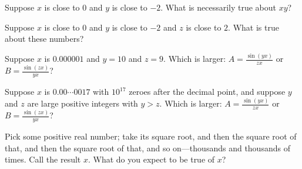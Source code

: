 \documentclass{ximera}
\begin{document}
\begin{problem}
  Suppose $x$ is close to $0$ and $y$ is close to $-2$.  What is necessarily true about $xy$?
  \begin{multipleChoice}
  \end{multipleChoice}
\end{problem}

\begin{problem}
  Suppose $x$ is close to $0$ and $y$ is close to $-2$ and $z$ is close to $2$.  What is true about these numbers?
  \begin{multipleChoice}
  \end{multipleChoice}
\end{problem}

\begin{problem}
  Suppose $x$ is $0.000001$ and $y = 10$ and $z = 9$.  Which is larger:
  $A = \frac{\sin (yx)}{zx}$ or $B = \frac{\sin (zx)}{yx}$?
  \begin{multipleChoice}
  \end{multipleChoice}
\end{problem}

\begin{problem}
  Suppose $x$ is $0.00\cdots 0017$ with $10^{17}$ zeroes after the
  decimal point, and suppose $y$ and $z$ are large positive integers
  with $y > z$.  Which is larger: $A = \frac{\sin (yx)}{zx}$ or
  $B = \frac{\sin (zx)}{yx}$?
  \begin{multipleChoice}
  \end{multipleChoice}
\end{problem}

\begin{problem}
  Pick some positive real number; take its square root, and then the
  square root of that, and then the square root of that, and so
  on---thousands and thousands of times.  Call the result $x$.  What
  do you expect to be true of $x$?
  \begin{multipleChoice}
  \end{multipleChoice}
\end{problem}
\end{document}
